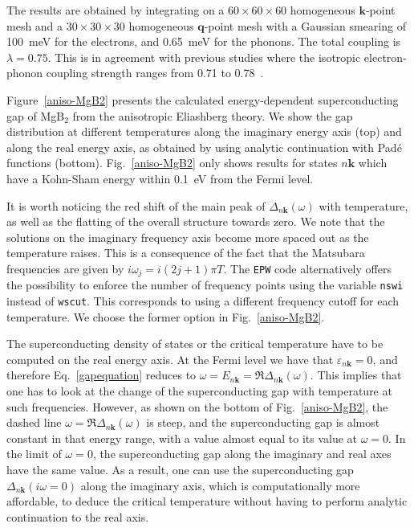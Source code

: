 \documentclass[final,3p,times,twocolumn]{elsarticle}
\begin{document}
The results are obtained by integrating on a $60\times60\times60$ homogeneous $\mathbf{k}$-point mesh and a $30\times30\times30$ homogeneous $\mathbf{q}$-point mesh with a Gaussian smearing of 100~meV for the electrons, and 0.65~meV for the phonons. The total coupling is $\lambda = 0.75$.
This is in agreement with previous studies where the isotropic electron-phonon coupling strength ranges from 0.71 to 0.78~\cite{Bohnen2001, Choi2002,Floris2005,Eiguren2008,Calandra2010}.




Figure~\ref{aniso-MgB2} presents the calculated energy-dependent superconducting gap of MgB$_2$ from the anisotropic Eliashberg theory.
We show the gap distribution at different temperatures along the imaginary energy axis (top) and along the real energy axis, as obtained by using analytic continuation with Pad\'e functions (bottom). Fig.~\ref{aniso-MgB2} only shows results for states $n\mathbf{k}$ which have a Kohn-Sham energy within 0.1~eV from the Fermi level. 

 
It is worth noticing the red shift of the main peak of $\Delta_{n\mathbf{k}}(\omega)$ with temperature, as well as the flatting of the overall structure towards zero. We note that the solutions on the imaginary frequency axis become more spaced out as the temperature raises.
This is a consequence of the fact that the Matsubara frequencies are given by $i \omega_j = i(2j+1) \pi T$.
The \texttt{EPW} code alternatively offers the possibility to enforce the number of frequency points using the variable \texttt{nswi} instead of \texttt{wscut}. This corresponds to using a different frequency cutoff for each temperature. We choose the former option in Fig.~\ref{aniso-MgB2}.




The superconducting density of states or the critical temperature have to be computed on the real energy axis. At the Fermi level we have that $\varepsilon_{n\mathbf{k}}=0$, and therefore Eq.~\eqref{gapequation} reduces to $\omega = E_{n\mathbf{k}} = \Re\Delta_{n\mathbf{k}}(\omega)$.
This implies that one has to look at the change of the superconducting gap with temperature at such frequencies. 
However, as shown on the bottom of Fig.~\ref{aniso-MgB2}, the dashed line $\omega = \Re\Delta_{n\mathbf{k}}(\omega)$ is steep, and the superconducting gap is almost constant in that energy range, with a value almost equal to its value at $\omega=0$. 
In the limit of $\omega=0$, the superconducting gap along the imaginary and real axes have the same value. 
As a result, one can use the superconducting gap $\Delta_{n\mathbf{k}}(i\omega=0)$ along the imaginary axis, which is computationally more affordable, to deduce the critical temperature without having to perform analytic continuation to the real axis. 
\end{document}
